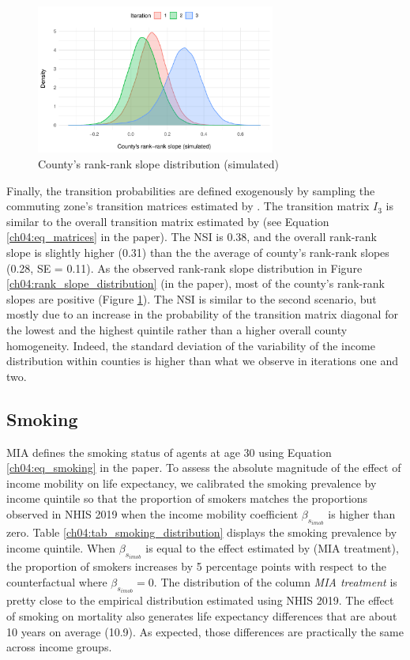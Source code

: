 \vspace{5mm}
\newpage
\begin{figure}
    \centering
    \caption{County's rank-rank slope distribution (simulated)}
    \label{ch04:verification_rank_slope}
    \includegraphics[width=0.7\textwidth]{plots/verification/income/county_rank_slope.pdf}
\end{figure}

Finally, the transition probabilities are defined exogenously by sampling the commuting zone's transition matrices estimated by \citet{chetty2014}. The transition matrix $I_3$ is similar to the overall transition matrix estimated by  \citet{chetty2014} (see Equation \ref{ch04:eq_matrices} in the paper). The NSI is 0.38, and the overall rank-rank slope is slightly higher (0.31) than the the average of county's rank-rank slopes (0.28, SE = 0.11). As the observed rank-rank slope distribution in Figure \ref{ch04:rank_slope_distribution} (in the paper), most of the county's rank-rank slopes are positive (Figure \ref{ch04:verification_rank_slope}). The NSI is similar to the second scenario, but mostly due to an increase in the probability of the transition matrix diagonal for the lowest and the highest quintile rather than a higher overall county homogeneity. Indeed, the standard deviation of the variability of the income distribution within counties is higher than what we observe in iterations one and two.

\subsection{Smoking}

MIA defines the smoking status of agents at age 30 using Equation \ref{ch04:eq_smoking} in the paper. To assess the absolute magnitude of the effect of income mobility on life expectancy, we calibrated the smoking prevalence by income quintile so that the proportion of smokers  matches the proportions observed in NHIS 2019 when the income mobility coefficient $\beta_{s_{imob}}$ is higher than zero. Table \ref{ch04:tab_smoking_distribution} displays the smoking prevalence by income quintile. When $\beta_{s_{imob}}$ is equal to the effect estimated by \citet{daza2021} (MIA treatment), the proportion of smokers increases by 5 percentage points with respect to the counterfactual where $\beta_{s_{imob}}  = 0$. The distribution of the column \textit{MIA treatment} is pretty close to the empirical distribution estimated using NHIS 2019. The effect of smoking on mortality also generates life expectancy differences that are about 10 years on average (10.9). As expected, those differences are practically the same across income groups.

